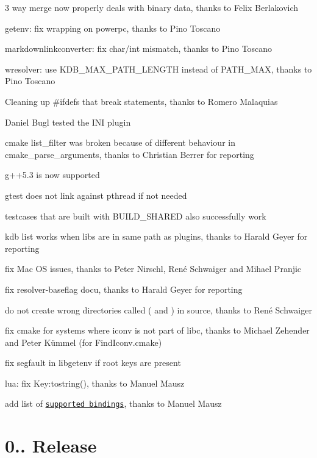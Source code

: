 \begin{DoxyItemize}
\item 3 way merge now properly deals with binary data, thanks to Felix Berlakovich
\item getenv\+: fix wrapping on powerpc, thanks to Pino Toscano
\item markdownlinkconverter\+: fix char/int mismatch, thanks to Pino Toscano
\item wresolver\+: use K\+D\+B\+\_\+\+M\+A\+X\+\_\+\+P\+A\+T\+H\+\_\+\+L\+E\+N\+G\+T\+H instead of P\+A\+T\+H\+\_\+\+M\+A\+X, thanks to Pino Toscano
\item Cleaning up \#ifdefs that break statements, thanks to Romero Malaquias
\item Daniel Bugl tested the I\+N\+I plugin
\item cmake list\+\_\+filter was broken because of different behaviour in cmake\+\_\+parse\+\_\+arguments, thanks to Christian Berrer for reporting
\item g++5.3 is now supported
\item gtest does not link against pthread if not needed
\item testcases that are built with B\+U\+I\+L\+D\+\_\+\+S\+H\+A\+R\+E\+D also successfully work
\item kdb list works when libs are in same path as plugins, thanks to Harald Geyer for reporting
\item fix Mac O\+S issues, thanks to Peter Nirschl, René Schwaiger and Mihael Pranjic
\item fix resolver-\/baseflag docu, thanks to Harald Geyer for reporting
\item do not create wrong directories called {\ttfamily (} and {\ttfamily )} in source, thanks to René Schwaiger
\item fix cmake for systems where iconv is not part of libc, thanks to Michael Zehender and Peter Kümmel (for Find\+Iconv.\+cmake)
\item fix segfault in libgetenv if root keys are present
\item lua\+: fix Key\+:tostring(), thanks to Manuel Mausz
\item add list of \href{https://github.com/ElektraInitiative/libelektra/tree/master/src/bindings}{\tt supported bindings}, thanks to Manuel Mausz
\end{DoxyItemize}

\section*{0.. Release}


